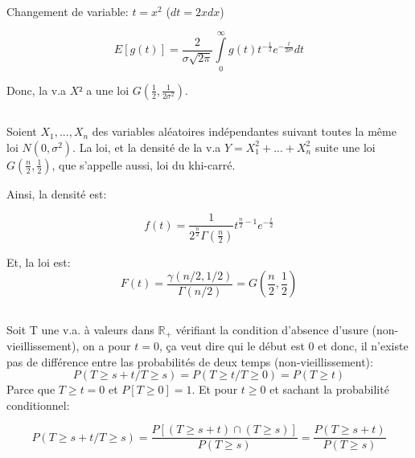 \documentclass[a4paper]{article}
\begin{document}
Changement de variable: $t=x^2$ ($dt=2xdx$)

\begin{equation}
E[g(t)]=\frac{2}{\sigma\sqrt{2\pi}}\int\limits_{0}^\infty g(t)t^{-\frac{1}{2}}e^{-\frac{t}{2\sigma²}}dt
\end{equation}

Donc, la v.a $X²$ a une loi $G(\frac{1}{2},\frac{1}{2\sigma^2})$.

\subsection{}
Soient $X_1,...,X_n$  des variables  aléatoires indépendantes suivant  toutes la
même loi  $N(0, \sigma^2)$.  La loi,  et la densité  de la  v.a $Y=X_1^2  +... +
X_n^2$ suite une loi $G(\frac{n}{2},\frac{1}{2})$, que s'appelle aussi, loi du khi-carré.

Ainsi, la densité est:

\begin{equation}
f(t)=\frac{1}{2^{\frac{n}{2}}\Gamma(\frac{n}{2})}t^{\frac{n}{2}-1}e^{-\frac{t}{2}}
\end{equation}

Et, la loi est:
\begin{equation}
F(t)=\frac{\gamma(n/2,1/2)}{\Gamma(n/2)}=G(\frac{n}{2},\frac{1}{2}) 
\end{equation}



\subsection{}
\subsubsection{}
Soit T une  v.a. à valeurs dans $\mathbb{R}_+$  vérifiant la condition d'absence
d'usure (non-vieillissement), on  a pour $t=0$, ça veut dire qui  le début est 0
et donc, il n'existe pas de différence entre las probabilités de deux temps (non-vieillissement):
\begin{equation}
P(T\geq s+t/ T \geq s)=P(T\geq t /T\geq 0)=P(T\geq t )
\end{equation}
Parce  que $T\geq  t=0$  et $P[T\geq  0]=1$. Et  pour  $t\geq 0$  et sachant  la
probabilité conditionnel:

\begin{equation}
P(T\geq s+t/ T\geq s)=\frac{P[(T\geq s+t )\cap (T \geq s)]}{P(T\geq s )}=\frac{P(T\geq s+t )}{P(T\geq s )}
\end{equation}
\end{document}
